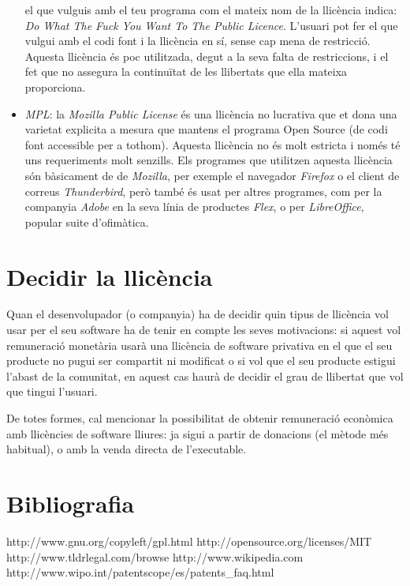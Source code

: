 \begin{itemize}
	el que vulguis amb el teu programa com el mateix nom de la llicència indica:
	\emph{Do What The Fuck You Want To The Public Licence}.
	L'usuari pot fer el que vulgui amb el codi font i la llicència en sí, sense
	cap mena de restricció. Aquesta llicència és poc utilitzada, degut a la seva
	falta de restriccions, i el fet que no assegura la continuïtat de les llibertats
	que ella mateixa proporciona.
	\item \emph{MPL}: la \emph{Mozilla Public License} és una llicència no lucrativa 
	que et dona una varietat explicita a mesura que mantens el programa Open Source
	(de codi font accessible per a tothom). Aquesta llicència no és molt estricta
	i només té uns requeriments molt senzills.
	Els programes que utilitzen aquesta llicència són bàsicament de de \emph{Mozilla},
	per exemple el navegador \emph{Firefox} o el client de correus \emph{Thunderbird},
	però també és usat per altres programes, com per la companyia \emph{Adobe} en
	la seva línia de productes \emph{Flex}, o per \emph{LibreOffice}, popular suite
	d'ofimàtica.
\end{itemize}

\section{Decidir la llicència}
Quan el desenvolupador (o companyia) ha de decidir quin tipus de llicència vol
usar per el seu software ha de tenir en compte les seves motivacions: si aquest
vol remuneració monetària usarà una llicència de software privativa en el que el 
seu producte no pugui ser compartit ni modificat o si vol que el seu producte estigui l'abast de 
la comunitat, en aquest cas haurà de decidir el grau de llibertat que vol que tingui 
l'usuari.

De totes formes, cal mencionar la possibilitat de obtenir remuneració econòmica amb llicències
de software lliures: ja sigui a partir de donacions (el mètode més habitual), o amb la
venda directa de l'executable.

\section{Bibliografia}
http://www.gnu.org/copyleft/gpl.html
http://opensource.org/licenses/MIT
http://www.tldrlegal.com/browse
http://www.wikipedia.com
http://www.wipo.int/patentscope/es/patents\_faq.html
